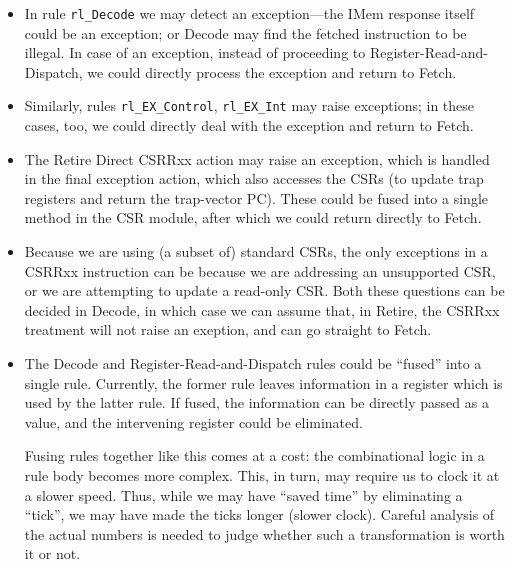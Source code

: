 \begin{itemize}

 \item In rule \verb|rl_Decode| we may detect an exception---the IMem
       response itself could be an exception; or Decode may find the
       fetched instruction to be illegal.  In case of an exception,
       instead of proceeding to Register-Read-and-Dispatch, we could
       directly process the exception and return to Fetch.

 \item Similarly, rules \verb|rl_EX_Control|, \verb|rl_EX_Int| may
       raise exceptions; in these cases, too, we could directly deal
       with the exception and return to Fetch.

 \item The Retire Direct CSRRxx action may raise an exception, which
       is handled in the final exception action, which also accesses
       the CSRs (to update trap registers and return the trap-vector
       PC).  These could be fused into a single method in the CSR
       module, after which  we could return directly to Fetch.

 \item Because we are using (a subset of) standard CSRs, the only
       exceptions in a CSRRxx instruction can be because we are
       addressing an unsupported CSR, or we are attempting to update a
       read-only CSR.  Both these questions can be decided in Decode,
       in which case we can assume that, in Retire, the CSRRxx
       treatment will not raise an exeption, and can go straight to
       Fetch.

 \item The Decode and Register-Read-and-Dispatch rules could be
       ``fused'' into a single rule.  Currently, the former rule
       leaves information in a register which is used by the latter
       rule.  If fused, the information can be directly passed as a
       value, and the intervening register could be eliminated.

       Fusing rules together like this comes at a cost: the
       combinational logic in a rule body becomes more complex.  This,
       in turn, may require us to clock it at a slower speed.  Thus,
       while we may have ``saved time'' by eliminating a ``tick'', we
       may have made the ticks longer (slower clock).  Careful
       analysis of the actual numbers is needed to judge whether such
       a transformation is worth it or not.

\end{itemize}


